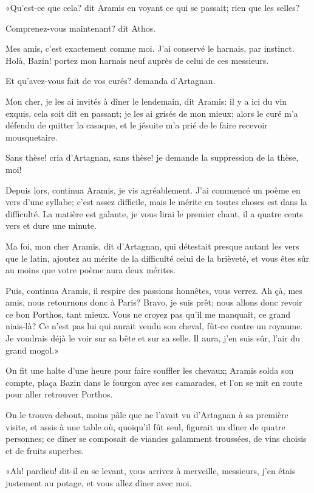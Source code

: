 «Qu'est-ce que cela? dit Aramis en voyant ce qui se passait; rien que les selles? 

\speak  Comprenez-vous maintenant? dit Athos. 

\speak  Mes amis, c'est exactement comme moi. J'ai conservé le harnais, par instinct. Holà, Bazin! portez mon harnais neuf auprès de celui de ces messieurs. 

\speak  Et qu'avez-vous fait de vos curés? demanda d'Artagnan. 

\speak  Mon cher, je les ai invités à dîner le lendemain, dit Aramis: il y a ici du vin exquis, cela soit dit en passant; je les ai grisés de mon mieux; alors le curé m'a défendu de quitter la casaque, et le jésuite m'a prié de le faire recevoir mousquetaire. 

\speak  Sans thèse! cria d'Artagnan, sans thèse! je demande la suppression de la thèse, moi! 

\speak  Depuis lors, continua Aramis, je vis agréablement. J'ai commencé un poème en vers d'une syllabe; c'est assez difficile, mais le mérite en toutes choses est dans la difficulté. La matière est galante, je vous lirai le premier chant, il a quatre cents vers et dure une minute. 

\speak  Ma foi, mon cher Aramis, dit d'Artagnan, qui détestait presque autant les vers que le latin, ajoutez au mérite de la difficulté celui de la brièveté, et vous êtes sûr au moins que votre poème aura deux mérites. 

\speak  Puis, continua Aramis, il respire des passions honnêtes, vous verrez. Ah çà, mes amis, nous retournons donc à Paris? Bravo, je suis prêt; nous allons donc revoir ce bon Porthos, tant mieux. Vous ne croyez pas qu'il me manquait, ce grand niais-là? Ce n'est pas lui qui aurait vendu son cheval, fût-ce contre un royaume. Je voudrais déjà le voir sur sa bête et sur sa selle. Il aura, j'en suis sûr, l'air du grand mogol.» 

On fit une halte d'une heure pour faire souffler les chevaux; Aramis solda son compte, plaça Bazin dans le fourgon avec ses camarades, et l'on se mit en route pour aller retrouver Porthos. 

On le trouva debout, moins pâle que ne l'avait vu d'Artagnan à sa première visite, et assis à une table où, quoiqu'il fût seul, figurait un dîner de quatre personnes; ce dîner se composait de viandes galamment troussées, de vins choisis et de fruits superbes. 

«Ah! pardieu! dit-il en se levant, vous arrivez à merveille, messieurs, j'en étais justement au potage, et vous allez dîner avec moi. 

